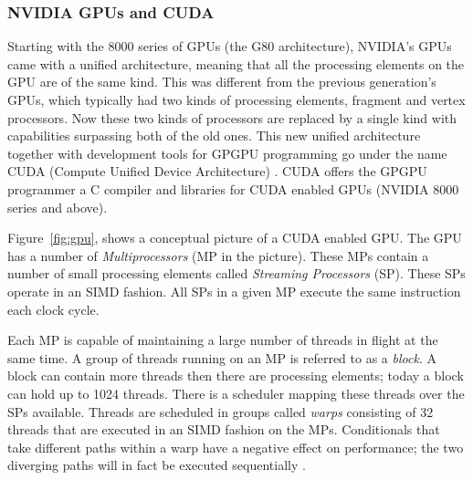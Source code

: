 \subsubsection{NVIDIA GPUs and CUDA}


Starting with the 8000 series of GPUs (the G80 architecture), NVIDIA's 
GPUs came with a unified architecture, meaning that all the 
processing elements on the GPU are of the same kind. This was different from 
the previous generation's GPUs, which typically had two kinds of 
processing elements, fragment and vertex processors.  
Now these two kinds 
of processors are replaced by a single kind with capabilities surpassing both 
of the old ones. This new unified architecture together with development tools 
for GPGPU programming go under the 
name CUDA (Compute Unified Device Architecture) 
. CUDA offers the GPGPU programmer a C %
compiler and libraries for CUDA enabled GPUs (NVIDIA 8000 series and above).  

Figure~\ref{fig:gpu}, shows a conceptual picture of a CUDA enabled GPU. The GPU 
has a number of {\em Multiprocessors} (MP in the picture). These MPs contain 
a number of small processing elements called {\em Streaming Processors} (SP). 
These SPs operate in an SIMD fashion. All SPs in a given MP execute 
the same instruction each clock cycle. 

Each MP is capable of maintaining a large number of threads in flight at the 
same time. A group of threads running on an MP is referred to as a {\em block}. 
A block can contain more threads then there are processing elements; today a 
block can hold up to 1024 threads. There is a scheduler mapping these threads 
over the SPs available. Threads are scheduled in groups called {\em warps} 
consisting of 32 threads that are executed in an SIMD fashion on the MPs.
Conditionals that take different paths within a warp have a negative effect 
on performance; the two diverging paths will in fact be executed sequentially 
.



